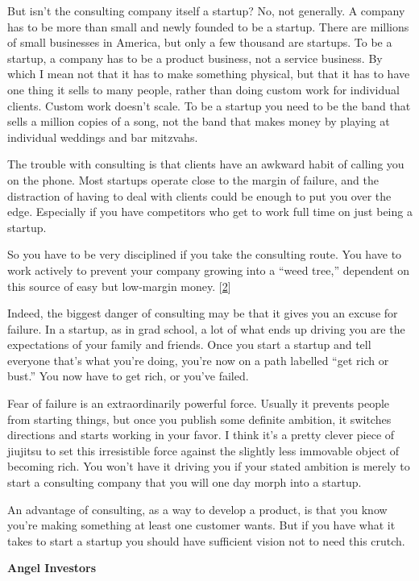 But isn't the consulting company itself a startup? No, not generally. A
company has to be more than small and newly founded to be a startup.
There are millions of small businesses in America, but only a few
thousand are startups. To be a startup, a company has to be a product
business, not a service business. By which I mean not that it has to
make something physical, but that it has to have one thing it sells to
many people, rather than doing custom work for individual clients.
Custom work doesn't scale. To be a startup you need to be the band that
sells a million copies of a song, not the band that makes money by
playing at individual weddings and bar mitzvahs.

The trouble with consulting is that clients have an awkward habit of
calling you on the phone. Most startups operate close to the margin of
failure, and the distraction of having to deal with clients could be
enough to put you over the edge. Especially if you have competitors who
get to work full time on just being a startup.

So you have to be very disciplined if you take the consulting route. You
have to work actively to prevent your company growing into a ``weed
tree,'' dependent on this source of easy but low-margin money.
{[}\hyperref[f2n]{2}{]}

Indeed, the biggest danger of consulting may be that it gives you an
excuse for failure. In a startup, as in grad school, a lot of what ends
up driving you are the expectations of your family and friends. Once you
start a startup and tell everyone that's what you're doing, you're now
on a path labelled ``get rich or bust.'' You now have to get rich, or
you've failed.

Fear of failure is an extraordinarily powerful force. Usually it
prevents people from starting things, but once you publish some definite
ambition, it switches directions and starts working in your favor. I
think it's a pretty clever piece of jiujitsu to set this irresistible
force against the slightly less immovable object of becoming rich. You
won't have it driving you if your stated ambition is merely to start a
consulting company that you will one day morph into a startup.

An advantage of consulting, as a way to develop a product, is that you
know you're making something at least one customer wants. But if you
have what it takes to start a startup you should have sufficient vision
not to need this crutch.

\textbf{Angel Investors}

